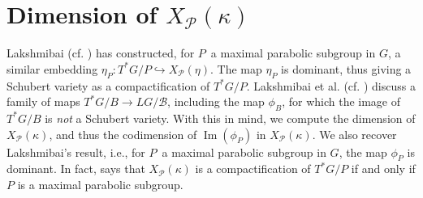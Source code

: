 \documentclass[paper=a4, fontsize=10pt]{amsart} %
\theoremstyle{plain}
\newtheorem{theorem}[subsection]{Theorem}
\theoremstyle{definition}
\theoremstyle{remark}
\numberwithin{equation}{section} %
\numberwithin{figure}{section} %
\numberwithin{table}{section} %
\numberwithin{subsection}{section} %
\def\borel{\ensuremath{B}}
\def\Borel{\ensuremath{\mathcal B}}
\def\gl{\ensuremath{G}}
\def\gL{\ensuremath{L\gl}}
\def\gLhat{\gL}
\def\gOhat{\ensuremath{L^+\gl}}
\def\para{\ensuremath{P}}
\def\Para{\ensuremath{\mathcal P}}
\def\u{\ensuremath{\mathfrak u}}
\def\W{\ensuremath {W}}
\def\E{\ensuremath{E}}
\def\What{\ensuremath{\widehat\W}}
\def\betac{\ensuremath{q}}
\def\image{\ensuremath{\operatorname{Im}}}
\def\Ni{\ensuremath{\mathcal N}}
\def\mod{\ensuremath{\mathrm{mod}\,}}
\begin{document}

\ifminuscule
\section{Dimension of $X_\Para(\kappa)$}
Lakshmibai (cf. \cite{vl}) has constructed, for \para\ a maximal parabolic subgroup in \gl, a similar embedding $\eta_\para:T^*\gl/\para\hookrightarrow X_\Para(\eta)$. 
The map $\eta_\para$ is dominant, thus giving a Schubert variety as a compactification of $T^*\gl/\para$.
Lakshmibai et al. (cf. \cite{crv}) discuss a family of maps $T^*\gl/\borel\rightarrow \gLhat/\Borel$, including the map $\phi_\borel$, for which the image of $T^*\gl/\borel$ is \emph{not} a Schubert variety.
With this in mind, we compute the dimension of $X_\Para(\kappa)$, and thus the codimension of $\image(\phi_\para)$ in $X_\Para(\kappa)$. 
We also recover Lakshmibai's result, i.e., for \para\ a maximal parabolic subgroup in \gl, the map $\phi_\para$ is dominant.
In fact,  says that $X_\Para(\kappa)$ is a compactification of $T^*G/P$ if and only if $P$ is a maximal parabolic subgroup.
\fi
\end{document}

